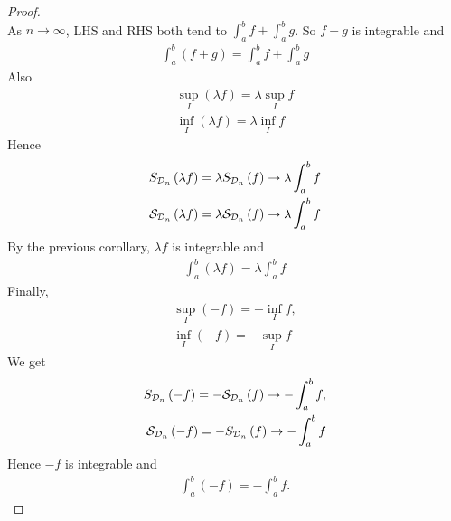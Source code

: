 \documentclass[a4paper]{article}
\begin{document}
\begin{thm}
\begin{proof}
\begin{equation*}
\end{equation*}
As $n\to \infty$, LHS and RHS both tend to $\int_a^b f + \int_a^b g$. So $f+g$ is integrable and
\begin{equation*}
\begin{aligned}
\int_a^b \left(f+g\right) = \int_a^b f + \int_a^b g
\end{aligned}
\end{equation*}
Also
\begin{equation*}
\begin{aligned}
\sup_I \left(\lambda f\right) = \lambda \sup_I f\\
\inf_I \left(\lambda f\right) = \lambda \inf_I f
\end{aligned}
\end{equation*}
Hence
\begin{equation*}
\begin{aligned}
S_{\mathcal{D}_n} \left(\lambda f\right) = \lambda S_{\mathcal{D}_n} \left(f\right) \to \lambda \int_a^b f\\
\mathcal{S}_{\mathcal{D}_n} \left(\lambda f\right) = \lambda \mathcal{S}_{\mathcal{D}_n} \left(f\right) \to \lambda \int_a^b f
\end{aligned}
\end{equation*}
By the previous corollary, $\lambda f$ is integrable and 
\begin{equation*}
\begin{aligned}
\int_a^b \left(\lambda f\right) = \lambda \int_a^b f
\end{aligned}
\end{equation*}
Finally,
\begin{equation*}
\begin{aligned}
\sup_I \left(-f\right) = -\inf_I f,\\
\inf_I \left(-f\right) = -\sup_I f
\end{aligned}
\end{equation*}
We get
\begin{equation*}
\begin{aligned}
S_{\mathcal{D}_n} \left(-f\right) = -\mathcal{S}_{\mathcal{D}_n} \left(f\right) \to -\int_a^b f,\\
\mathcal{S}_{\mathcal{D}_n} \left(-f\right) = -S_{\mathcal{D}_n} \left(f\right) \to -\int_a^b f
\end{aligned}
\end{equation*}
Hence $-f$ is integrable and
\begin{equation*}
\begin{aligned}
\int_a^b \left(-f\right) = -\int_a^b f.
\end{aligned}
\end{equation*}

\end{proof}
\end{thm}
\end{document}
